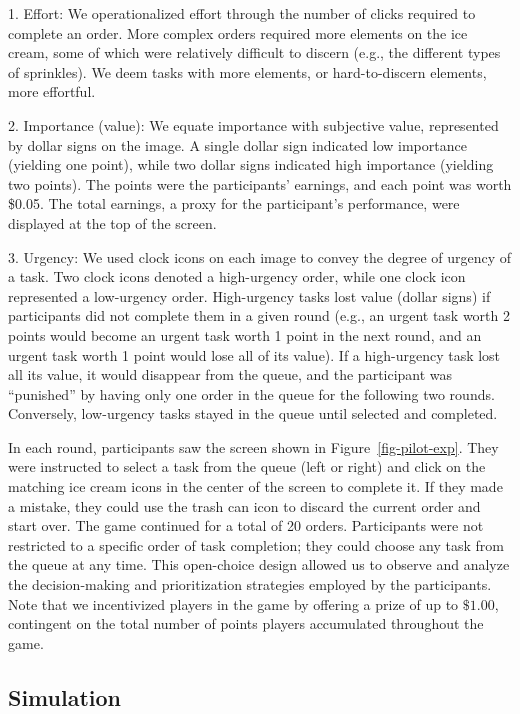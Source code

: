 \documentclass[
]{report}
\begin{document}
1. Effort: We operationalized effort through the number of clicks
required to complete an order. More complex orders required more
elements on the ice cream, some of which were relatively difficult to
discern (e.g., the different types of sprinkles). We deem tasks with
more elements, or hard-to-discern elements, more effortful.

2. Importance (value): We equate importance with subjective value,
represented by dollar signs on the image. A single dollar sign indicated
low importance (yielding one point), while two dollar signs indicated
high importance (yielding two points). The points were the participants'
earnings, and each point was worth \$0.05. The total earnings, a proxy
for the participant's performance, were displayed at the top of the
screen.

3. Urgency: We used clock icons on each image to convey the degree of
urgency of a task. Two clock icons denoted a high-urgency order, while
one clock icon represented a low-urgency order. High-urgency tasks lost
value (dollar signs) if participants did not complete them in a given
round (e.g., an urgent task worth 2 points would become an urgent task
worth 1 point in the next round, and an urgent task worth 1 point would
lose all of its value). If a high-urgency task lost all its value, it
would disappear from the queue, and the participant was ``punished'' by
having only one order in the queue for the following two rounds.
Conversely, low-urgency tasks stayed in the queue until selected and
completed.

In each round, participants saw the screen shown in
Figure~\ref{fig-pilot-exp}. They were instructed to select a task from
the queue (left or right) and click on the matching ice cream icons in
the center of the screen to complete it. If they made a mistake, they
could use the trash can icon to discard the current order and start
over. The game continued for a total of 20 orders. Participants were not
restricted to a specific order of task completion; they could choose any
task from the queue at any time. This open-choice design allowed us to
observe and analyze the decision-making and prioritization strategies
employed by the participants. Note that we incentivized players in the
game by offering a prize of up to \(\$1.00\), contingent on the total
number of points players accumulated throughout the game.

\hypertarget{simulation-1}{%
\subsection{Simulation}\label{simulation-1}}
\end{document}
